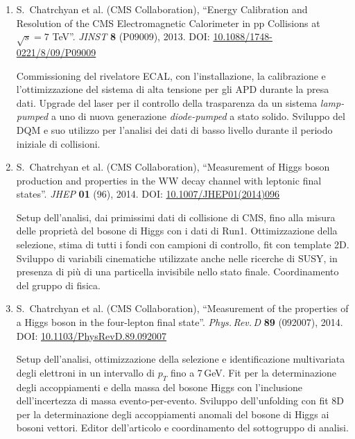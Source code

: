 \documentclass[11pt,twoside,a4paper]{article}
\begin{document}
\begin{enumerate}
  Commissioning del rivelatore ECAL, con l'installazione, la
  calibrazione e l'ottimizzazione del sistema di alta tensione per gli
  APD durante la presa dati. Upgrade del laser per il controllo della
  trasparenza da un sistema \textit{lamp-pumped} a uno di nuova
  generazione \textit{diode-pumped} a stato solido. Sviluppo del DQM e
  suo utilizzo per l'analisi dei dati di basso livello durante il
  periodo iniziale di collisioni.

\item S.~Chatrchyan et al. (CMS Collaboration), ``Energy Calibration
  and Resolution of the CMS Electromagnetic Calorimeter in pp
  Collisions at $\sqrt{s} = 7$ TeV''. \textit{JINST} \textbf{8}
  (P09009), 2013. DOI:
  \href{https://iopscience.iop.org/article/10.1088/1748-0221/8/09/P09009/meta}{10.1088/1748-0221/8/09/P09009}

  Commissioning del rivelatore ECAL, con l'installazione, la
  calibrazione e l'ottimizzazione del sistema di alta tensione per gli
  APD durante la presa dati. Upgrade del laser per il controllo della
  trasparenza da un sistema \textit{lamp-pumped} a uno di nuova
  generazione \textit{diode-pumped} a stato solido. Sviluppo del DQM e
  suo utilizzo per l'analisi dei dati di basso livello durante il
  periodo iniziale di collisioni.

\item S.~Chatrchyan et al. (CMS Collaboration), ``Measurement of Higgs
  boson production and properties in the WW decay channel with
  leptonic final states''. \textit{JHEP} \textbf{01} (96), 2014. DOI:
  \href{https://link.springer.com/article/10.1007/JHEP01(2014)096}{10.1007/JHEP01(2014)096}

  Setup dell'analisi, dai primissimi dati di collisione di CMS, fino
  alla misura delle propriet\`a del bosone di Higgs con i dati di
  Run1. Ottimizzazione della selezione, stima di tutti i fondi con
  campioni di controllo, fit con template 2D. Sviluppo di variabili
  cinematiche utilizzate anche nelle ricerche di SUSY, in presenza di
  pi\`u di una particella invisibile nello stato finale. Coordinamento
  del gruppo di fisica.

\item S.~Chatrchyan et al. (CMS Collaboration), ``Measurement of the
  properties of a Higgs boson in the four-lepton final state''.
  \textit{Phys.\,Rev.\,D} \textbf{89} (092007), 2014. DOI:
  \href{https://journals.aps.org/prd/abstract/10.1103/PhysRevD.89.092007}{10.1103/PhysRevD.89.092007}

  Setup dell'analisi, ottimizzazione della selezione e identificazione
  multivariata degli elettroni in un intervallo di $p_T$ fino a
  7\,GeV. Fit per la determinazione degli accoppiamenti e della massa
  del bosone Higgs con l'inclusione dell'incertezza di massa
  evento-per-evento. Sviluppo dell'unfolding con fit 8D per la
  determinazione degli accoppiamenti anomali del bosone di Higgs ai
  bosoni vettori. Editor dell'articolo e coordinamento del sottogruppo
  di analisi.


\end{enumerate}
\end{document}
